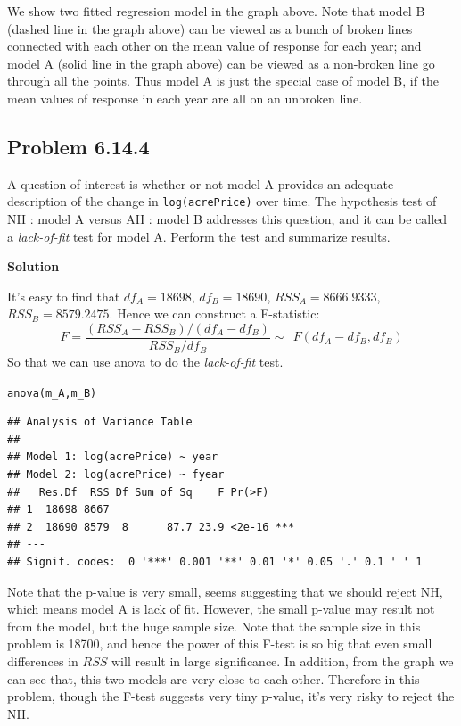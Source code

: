\documentclass[12pt,oneside,a4paper]{article}\usepackage[]{graphicx}\usepackage[]{xcolor}
\makeatletter
\newcommand{\hlstd}[1]{\textcolor[rgb]{0,0,0}{#1}}%
\newcommand{\hlkwd}[1]{\textcolor[rgb]{0,0,0}{#1}}%
\newenvironment{kframe}{%
 \def\at@end@of@kframe{}%
 \ifinner\ifhmode%
  \def\at@end@of@kframe{\end{minipage}}%
  \begin{minipage}{\columnwidth}%
 \fi\fi%
 \def\FrameCommand##1{\hskip\@totalleftmargin \hskip-\fboxsep
 \colorbox{shadecolor}{##1}\hskip-\fboxsep
     \hskip-\linewidth \hskip-\@totalleftmargin \hskip\columnwidth}%
 \MakeFramed {\advance\hsize-\width
   \@totalleftmargin\z@ \linewidth\hsize
   \@setminipage}}%
 {\par\unskip\endMakeFramed%
 \at@end@of@kframe}
\newenvironment{knitrout}{}{} %
\newcommand{\subproblem}[1]
{
    \subsection*{Problem {#1}}
}
\newcommand{\solution}
{
    \vspace{15pt}
    \noindent\ignorespaces\textbf{\large Solution}
}
\newcommand{\m}[1]{\texttt{{#1}}}
\makeatother
\begin{document}
We show two fitted regression model in the graph above. Note that model B (dashed line in the graph above) can be viewed as a bunch of broken lines connected with each other on the mean value of response for each year; and model A (solid line in the graph above) can be viewed as a non-broken line go through all the points. Thus model A is just the special case of model B, if the mean values of response in each year are all on an unbroken line.

\subproblem{6.14.4}
A question of interest is whether or not model A provides an adequate description of the change in \m{log(acrePrice)} over time. The hypothesis test of NH : model A versus AH : model B addresses this question, and it can be called a \emph{lack-of-fit} test for model A. Perform the test and summarize results.

\solution

It's easy to find that $df_{A} = 18698$, $df_{B} = 18690$, $RSS_{A} = 8666.9333$, $RSS_{B} = 8579.2475$. Hence we can construct a F-statistic:
$$F = \frac{(RSS_{A} - RSS_{B}) / (df_{A} - df_{B})}{RSS_{B} / df_{B}} \sim~~F(df_{A} - df_{B}, df_{B})$$
So that we can use anova to do the \emph{lack-of-fit} test.
\begin{knitrout}
\color{fgcolor}\begin{kframe}
\begin{alltt}
\hlkwd{anova}\hlstd{(m_A, m_B)}
\end{alltt}
\begin{verbatim}
## Analysis of Variance Table
## 
## Model 1: log(acrePrice) ~ year
## Model 2: log(acrePrice) ~ fyear
##   Res.Df  RSS Df Sum of Sq    F Pr(>F)    
## 1  18698 8667                             
## 2  18690 8579  8      87.7 23.9 <2e-16 ***
## ---
## Signif. codes:  0 '***' 0.001 '**' 0.01 '*' 0.05 '.' 0.1 ' ' 1
\end{verbatim}
\end{kframe}
\end{knitrout}
Note that the p-value is very small, seems suggesting that we should reject NH, which means model A is lack of fit. However, the small p-value may result not from the model, but the huge sample size. Note that the sample size in this problem is 18700, and hence the power of this F-test is so big that even small differences in $RSS$ will result in large significance. In addition, from the graph we can see that, this two models are very close to each other. Therefore in this problem, though the F-test suggests very tiny p-value, it's very risky to reject the NH.
\end{document}
